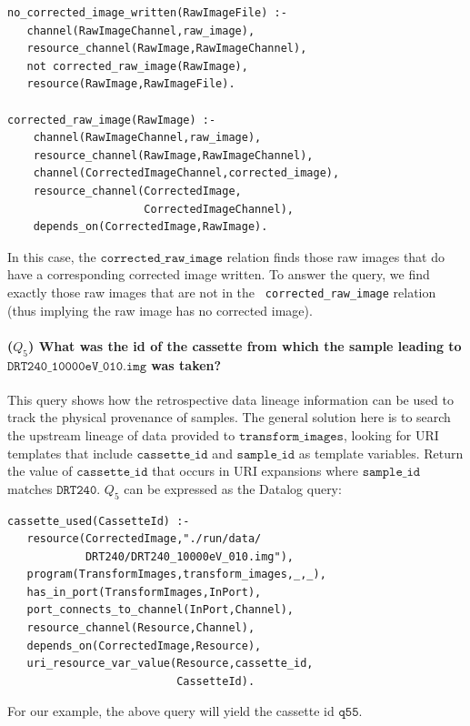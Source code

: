 \documentclass[nocopyrightspace]{sigplanconf}
\newcommand{\code}[1]{\ensuremath{\mathtt{#1}}}
\begin{document}
\begin{small}
\begin{verbatim}
no_corrected_image_written(RawImageFile) :-
   channel(RawImageChannel,raw_image),
   resource_channel(RawImage,RawImageChannel),
   not corrected_raw_image(RawImage),
   resource(RawImage,RawImageFile).

corrected_raw_image(RawImage) :-
    channel(RawImageChannel,raw_image),
    resource_channel(RawImage,RawImageChannel),
    channel(CorrectedImageChannel,corrected_image),
    resource_channel(CorrectedImage,
                     CorrectedImageChannel),
    depends_on(CorrectedImage,RawImage).
\end{verbatim}
\end{small}
In this case, the \code{corrected\_raw\_image} relation finds those raw
images that do have a corresponding corrected image written. To answer
the query, we find exactly those raw images that are not in the  {\tt
  corrected\_raw\_image} relation (thus implying the raw image has no
corrected image).

\paragraph{($Q_5$) What was the id of the cassette from which the
  sample leading to \code{DRT240\_10000eV\_010.img} was taken?} This
query shows how the retrospective data lineage information can be used
to track the physical provenance of samples.  The general solution
here is to search the upstream lineage of data provided to
\code{transform\_images}, looking for URI templates that include
\code{cassette\_id} and \code{sample\_id} as template
variables. Return the value of \code{cassette\_id} that occurs in URI
expansions where \code{sample\_id} matches \code{DRT240}. $Q_5$ can be
expressed as the Datalog query:
\begin{small}
\begin{verbatim}
cassette_used(CassetteId) :-
   resource(CorrectedImage,"./run/data/
            DRT240/DRT240_10000eV_010.img"),
   program(TransformImages,transform_images,_,_),
   has_in_port(TransformImages,InPort), 
   port_connects_to_channel(InPort,Channel), 
   resource_channel(Resource,Channel), 
   depends_on(CorrectedImage,Resource), 
   uri_resource_var_value(Resource,cassette_id,
                          CassetteId).
\end{verbatim}
\end{small}
For our example, the above query will yield the cassette id  \code{q55}.
\end{document}
